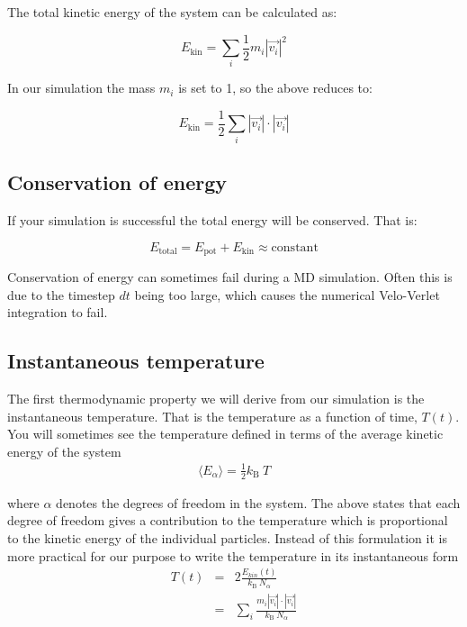 \documentclass{article}
\begin{document}
The total kinetic energy of the system can be calculated as:

\begin{equation}
    E_{\mathrm{kin}} = \sum_i \frac{1}{2} m_i |\vec{v_i}|^2
\end{equation}

In our simulation the mass $m_i$ is set to 1, so the above reduces to:

\begin{equation}
    E_{\mathrm{kin}} = \frac{1}{2} \sum_i |\vec{v_i}| \cdot |\vec{v_i}|
\end{equation}

% 
% 


\subsection{Conservation of energy}

If your simulation is successful the total energy will be conserved. That is:

\begin{equation}
    E_{\mathrm{total}} = E_{\mathrm{pot}} + E_{\mathrm{kin}} \approx \mathrm{constant}
\end{equation}

Conservation of energy can sometimes fail during a MD simulation.
Often this is due to the timestep $dt$ being too large, which causes the numerical Velo-Verlet integration to fail.

\subsection{Instantaneous temperature}

The first thermodynamic property we will derive from our simulation is the instantaneous temperature.
That is the temperature as a function of time, $T(t)$.
You will sometimes see the temperature defined in terms of the average kinetic energy of the system
\begin{eqnarray}
    \langle E_{\alpha} \rangle = \frac{1}{2} k_\mathrm{B} \ T
\end{eqnarray}

where $\alpha$ denotes the degrees of freedom in the system.
The above states that each degree of freedom gives a contribution to the temperature which is proportional to the kinetic energy of the individual particles.
Instead of this formulation it is more practical for our purpose to write the temperature in its instantaneous form
\begin{eqnarray}
    T(t) &=& 2 \frac{E_{kin}(t)}{k_\mathrm{B} \ N_\alpha }\\
         &=& \sum_i \frac{m_i|\vec{v_i}| \cdot |\vec{v_i}|}{k_\mathrm{B} \ N_\alpha}
\end{eqnarray}
\end{document}
